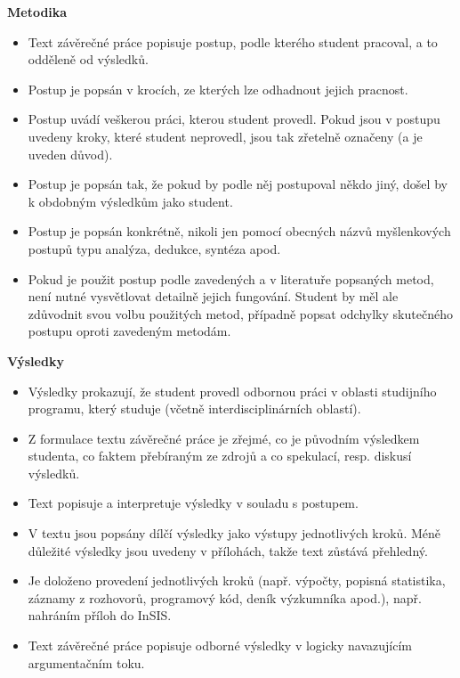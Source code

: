 {\bfseries\sffamily\Large Metodika}
\begin{itemize}
\item \vspace*{-2ex}Text závěrečné práce popisuje postup, podle kterého student pracoval, a to odděleně od výsledků.
\item Postup je popsán v krocích, ze kterých lze odhadnout jejich pracnost.
\item Postup uvádí veškerou práci, kterou student provedl. Pokud jsou v postupu uvedeny kroky, které student neprovedl, jsou tak zřetelně označeny (a je uveden důvod).
\item Postup je popsán tak, že pokud by podle něj postupoval někdo jiný, došel by k obdobným výsledkům jako student.
\item Postup je popsán konkrétně, nikoli jen pomocí obecných názvů myšlenkových postupů typu analýza, dedukce, syntéza apod.
\item Pokud je použit postup podle zavedených a v literatuře popsaných metod, není nutné vysvětlovat detailně jejich fungování. Student by měl ale zdůvodnit svou volbu použitých metod, případně popsat odchylky skutečného postupu oproti zavedeným metodám.
\end{itemize}

{\bfseries\sffamily\Large Výsledky}
\begin{itemize}
\item \vspace*{-2ex}Výsledky prokazují, že student provedl odbornou práci v oblasti studijního programu, který studuje (včetně interdisciplinárních oblastí).
\item Z formulace textu závěrečné práce je zřejmé, co je původním výsledkem studenta, co faktem přebíraným ze zdrojů a co spekulací, resp. diskusí výsledků.
\item Text popisuje a interpretuje výsledky v souladu s postupem.
\item V textu jsou popsány dílčí výsledky jako výstupy jednotlivých kroků. Méně důležité výsledky jsou uvedeny v přílohách, takže text zůstává přehledný.
\item Je doloženo provedení jednotlivých kroků (např. výpočty, popisná statistika, záznamy z rozhovorů, programový kód, deník výzkumníka apod.), např. nahráním příloh do InSIS.
\item Text závěrečné práce popisuje odborné výsledky v logicky navazujícím argumentačním toku. 
\end{itemize}

